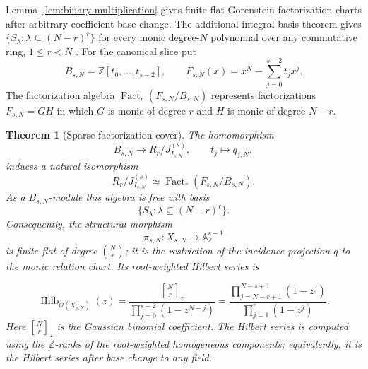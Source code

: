 \documentclass[10pt,fleqn]{article}
\numberwithin{equation}{section}
\newtheorem{theorem}{Theorem}[section]
\newcommand{\A}{\mathbb A}
\newcommand{\Hilb}{\operatorname{Hilb}}
\newcommand{\Fact}{\operatorname{Fact}}
\begin{document}
Lemma~\ref{lem:binary-multiplication} gives finite flat Gorenstein
factorization charts after arbitrary coefficient base change.
The additional integral basis theorem gives
$\{S_\lambda:\lambda\subseteq(N-r)^r\}$ for every monic degree-$N$
polynomial over any commutative ring, $1\le r<N$
\cite[Theorem~0.6 and Corollary~0.7]{LaksovThorup}.
For the canonical slice put
\begin{equation}\label{eq:sparse-base-polynomial}
 B_{s,N}=\mathbb Z[t_0,\ldots,t_{s-2}],\qquad
 F_{s,N}(x)=x^N-\sum_{j=0}^{s-2}t_jx^j.
\end{equation}
The factorization algebra $\Fact_r(F_{s,N}/B_{s,N})$ represents factorizations
$F_{s,N}=GH$ in which $G$ is monic of degree $r$ and $H$ is monic of degree $N-r$.

\begin{theorem}[Sparse factorization cover]\label{thm:canonical-factorization}\label{cor:canonical-Hilbert}
The homomorphism
\begin{equation}\label{eq:sparse-base-map}
 B_{s,N}\longrightarrow R_r/J_{I_{s,N}}^{(s)},
 \qquad t_j\longmapsto q_{j,N},
\end{equation}
induces a natural isomorphism
\begin{equation}\label{eq:factorization-isomorphism}
 R_r/J_{I_{s,N}}^{(s)}\simeq\Fact_r(F_{s,N}/B_{s,N}).
\end{equation}
As a $B_{s,N}$-module this algebra is free with basis
\begin{equation}\label{eq:factorization-Schur-basis}
 \{S_\lambda:\lambda\subseteq(N-r)^r\}.
\end{equation}
Consequently, the structural morphism
\begin{equation}\label{eq:canonical-pi}
 \pi_{s,N}:X_{s,N}\longrightarrow\A_{\mathbb Z}^{s-1}
\end{equation}
is finite flat of degree $\binom Nr$; it is the restriction of the incidence
projection $q$ to the monic relation chart.  Its root-weighted Hilbert series is

\begin{equation}\label{eq:canonical-Hilbert}
 \Hilb_{\mathcal O(X_{s,N})}(z)
 =\frac{\genfrac{[}{]}{0pt}{}{N}{r}_z}
 {\prod_{j=0}^{s-2}(1-z^{N-j})}
 =\frac{\prod_{j=N-r+1}^{N-s+1}(1-z^j)}
 {\prod_{j=1}^r(1-z^j)}.
\end{equation}
Here $\genfrac{[}{]}{0pt}{}{N}{r}_z$ is the Gaussian binomial coefficient.
The Hilbert series is computed using the $\mathbb Z$-ranks
of the root-weighted homogeneous components; equivalently,
it is the Hilbert series after base change to any field.
\end{theorem}
\end{document}
